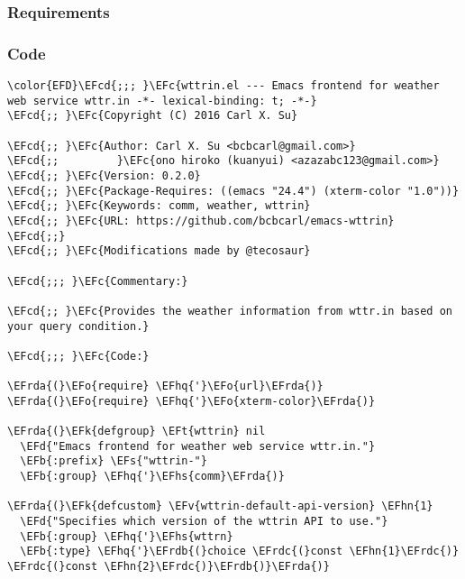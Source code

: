 \documentclass[a4wide,10pt]{article}
\newcommand{\EFc}[1]{\textcolor{EFc}{#1}} %
\newcommand{\EFcd}[1]{\textcolor{EFcd}{#1}} %
\newcommand{\EFs}[1]{\textcolor{EFs}{#1}} %
\newcommand{\EFd}[1]{\textcolor{EFd}{#1}} %
\newcommand{\EFk}[1]{\textcolor{EFk}{#1}} %
\newcommand{\EFb}[1]{\textcolor{EFb}{#1}} %
\newcommand{\EFv}[1]{\textcolor{EFv}{#1}} %
\newcommand{\EFt}[1]{\textcolor{EFt}{#1}} %
\newcommand{\EFo}[1]{\textcolor{EFo}{#1}} %
\newcommand{\EFhn}[1]{\textcolor{EFhn}{\textbf{#1}}} %
\newcommand{\EFhq}[1]{\textcolor{EFhq}{#1}} %
\newcommand{\EFhs}[1]{\textcolor{EFhs}{#1}} %
\newcommand{\EFrda}[1]{\textcolor{EFrda}{#1}} %
\newcommand{\EFrdb}[1]{\textcolor{EFrdb}{#1}} %
\newcommand{\EFrdc}[1]{\textcolor{EFrdc}{#1}} %
\begin{document}
\subsubsection{Requirements}
\label{sec:org48984a9}
\subsubsection{Code}
\label{sec:orgcba894e}
\begin{Code}
\begin{Verbatim}
\color{EFD}\EFcd{;;; }\EFc{wttrin.el --- Emacs frontend for weather web service wttr.in -*- lexical-binding: t; -*-}
\EFcd{;; }\EFc{Copyright (C) 2016 Carl X. Su}

\EFcd{;; }\EFc{Author: Carl X. Su <bcbcarl@gmail.com>}
\EFcd{;;         }\EFc{ono hiroko (kuanyui) <azazabc123@gmail.com>}
\EFcd{;; }\EFc{Version: 0.2.0}
\EFcd{;; }\EFc{Package-Requires: ((emacs "24.4") (xterm-color "1.0"))}
\EFcd{;; }\EFc{Keywords: comm, weather, wttrin}
\EFcd{;; }\EFc{URL: https://github.com/bcbcarl/emacs-wttrin}
\EFcd{;;}
\EFcd{;; }\EFc{Modifications made by @tecosaur}

\EFcd{;;; }\EFc{Commentary:}

\EFcd{;; }\EFc{Provides the weather information from wttr.in based on your query condition.}

\EFcd{;;; }\EFc{Code:}

\EFrda{(}\EFo{require} \EFhq{'}\EFo{url}\EFrda{)}
\EFrda{(}\EFo{require} \EFhq{'}\EFo{xterm-color}\EFrda{)}

\EFrda{(}\EFk{defgroup} \EFt{wttrin} nil
  \EFd{"Emacs frontend for weather web service wttr.in."}
  \EFb{:prefix} \EFs{"wttrin-"}
  \EFb{:group} \EFhq{'}\EFhs{comm}\EFrda{)}

\EFrda{(}\EFk{defcustom} \EFv{wttrin-default-api-version} \EFhn{1}
  \EFd{"Specifies which version of the wttrin API to use."}
  \EFb{:group} \EFhq{'}\EFhs{wttrn}
  \EFb{:type} \EFhq{'}\EFrdb{(}choice \EFrdc{(}const \EFhn{1}\EFrdc{)} \EFrdc{(}const \EFhn{2}\EFrdc{)}\EFrdb{)}\EFrda{)}


\end{Verbatim}
\end{Code}
\end{document}
